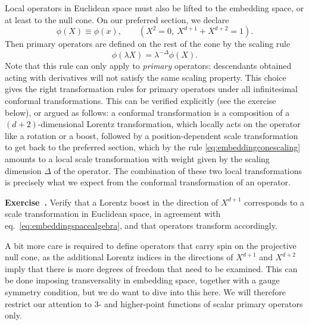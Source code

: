 \documentclass[a4paper,12pt]{article}
\numberwithin{equation}{section}
\newcounter{exercise}[section]
\newenvironment{exercise}[1][]%
	{\refstepcounter{exercise}\bigskip
	\begin{mdframed}[backgroundcolor=gray!20, linewidth=0]
	\noindent\textbf{Exercise~\thesection.\theexercise #1} \rmfamily}
  	{\end{mdframed}\bigskip}
\begin{document}
Local operators in Euclidean space must also be lifted to the embedding space, or at least to the null cone. On our preferred section, we declare
\begin{equation}
	\phi(X) \equiv \phi(x),
	\qquad 
	\left( X^2 = 0, ~ X^{d+1} + X^{d+2} = 1 \right).
\end{equation}
Then primary operators are defined on the rest of the cone by the scaling rule
\begin{equation}
	\phi(\lambda X) = \lambda^{-\Delta} \phi(X).
	\label{eq:embeddingconescaling}
\end{equation}
Note that this rule can only apply to \emph{primary} operators: descendants obtained acting with derivatives will not satisfy the same scaling property.
This choice gives the right transformation rules for primary operators under all infinitesimal conformal transformations. This can be verified explicitly (see the exercise below), or argued as follows: a conformal transformation is a composition of a $(d+2)$-dimensional Lorentz transformation, which locally acts on the operator like a rotation or a boost, followed by a position-dependent scale transformation to get back to the preferred section, which by the rule \eqref{eq:embeddingconescaling} amounts to a local scale transformation with weight given by the scaling dimension $\Delta$ of the operator. The combination of these two local transformations is precisely what we expect from the conformal transformation of an operator.
%
\begin{exercise}
	Verify that a Lorentz boost in the direction of $X^{d+1}$
	corresponds to a scale transformation in Euclidean space,
	in agreement with eq.~\eqref{eq:embeddingspacealgebra},
	and that operators transform accordingly. 
\end{exercise}

A bit more care is required to define operators that carry spin on the projective null cone, as the additional Lorentz indices in the directions of $X^{d+1}$ and $X^{d+2}$ imply that there is more degrees of freedom that need to be examined. This can be done imposing transversality in embedding space, together with a gauge symmetry condition, but we do want to dive into this here. We will therefore restrict our attention to 3- and higher-point functions of scalar primary operators only.
\end{document}
